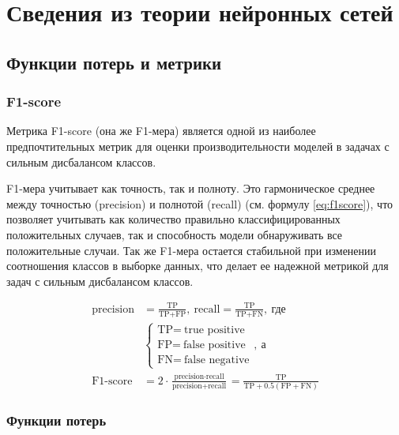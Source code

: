 \chapter{Сведения из теории нейронных сетей}

\section{Функции потерь и метрики}
\subsection{F1-score}
Метрика F1-score (она же F1-мера) является одной из наиболее предпочтительных метрик для оценки
производительности моделей в задачах с сильным дисбалансом классов.

F1-мера учитывает как точность, так и полноту. Это гармоническое среднее между
точностью (precision) и полнотой (recall) (см. формулу \ref{eq:f1score}), что позволяет
учитывать как количество правильно классифицированных положительных случаев,
так и способность модели обнаруживать все положительные случаи. Так же F1-мера
остается стабильной при изменении соотношения классов в выборке данных, что
делает ее надежной метрикой для задач с сильным дисбалансом классов.

\begin{align}
	\text{precision} & = \frac{\text{TP}}{\text{TP} + \text{FP}}, \: \text{recall} = \frac{\text{TP}}{\text{TP} + \text{FN}}, \: \text{где}                               \\
	                 & \begin{cases}
		                   \text{TP} = \: \text{true positive}  \\
		                   \text{FP} = \: \text{false positive} \\
		                   \text{FN} = \: \text{false negative}
	                   \end{cases}, \: \text{а}                                                                                                               \\
	\text{F1-score}  & = 2 \cdot \frac{\text{precision} \cdot \text{recall}}{\text{precision} + \text{recall}} = \frac{\text{TP}}{\text{TP} + 0.5(\text{FP} + \text{FN})}
	\label{eq:f1score}
\end{align}

\subsection{Функции потерь}
